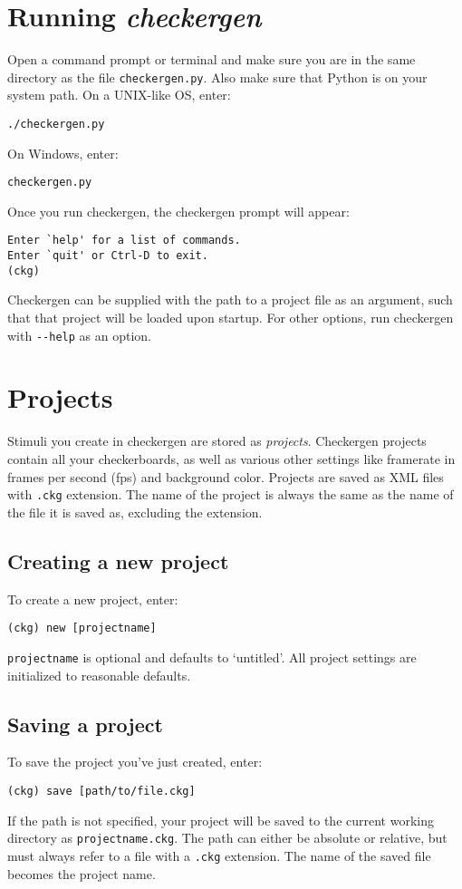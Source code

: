 \documentclass[12pt,titlepage]{article}
\begin{document}
\section{Running \emph{checkergen}}

Open a command prompt or terminal and make sure you are in the same
directory as the file \texttt{checkergen.py}. Also make sure that Python
is on your system path. On a UNIX-like OS, enter:
\begin{lstlisting}
./checkergen.py
\end{lstlisting}
On Windows, enter:
\begin{lstlisting}
checkergen.py
\end{lstlisting}

Once you run checkergen, the checkergen prompt will appear:
\begin{lstlisting}
Enter `help' for a list of commands.
Enter `quit' or Ctrl-D to exit.
(ckg) 
\end{lstlisting}

Checkergen can be supplied with the path to a project file as an
argument, such that that project will be loaded upon startup. For
other options, run checkergen with \lstinline{--help} as an option.

\section{Projects}

Stimuli you create in checkergen are stored as
\emph{projects}. Checkergen projects contain all your checkerboards,
as well as various other settings like framerate in frames per second
(fps) and background color. Projects are saved as XML files with 
\texttt{.ckg} extension. The name of the project is always the same as
the name of the file it is saved as, excluding the extension.

\subsection{Creating a new project}

To create a new project, enter: 
\begin{lstlisting}
(ckg) new [projectname]
\end{lstlisting}
\lstinline{projectname} is optional and defaults to `untitled'. All
project settings are initialized to reasonable defaults.

\subsection{Saving a project}
To save the project you've just created, enter: 
\begin{lstlisting}
(ckg) save [path/to/file.ckg]
\end{lstlisting}
If the path is not specified, your project will be saved to the
current working directory as \lstinline{projectname.ckg}. The path can
either be absolute or relative, but must always refer to a file with a
\texttt{.ckg} extension. The name of the saved file becomes the project
name.
\end{document}
